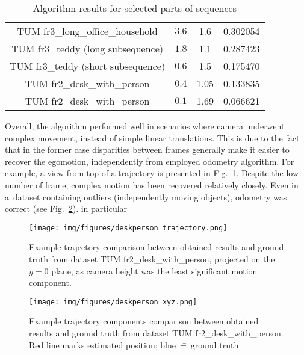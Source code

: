 \begin{table}[ht]
	\centering
	
	\begin{threeparttable}
		\caption{Algorithm results for selected parts of sequences}
		\label{tab:drift}
		
		\begin{tabularx}{0.9\textwidth}{C{0.32} C{0.2} C{0.15} C{0.33}}
			\toprule
			 &  &  & \\
			\midrule
			TUM fr3\_long\_office\_household & $3.6$ & 1.6 &  0.302054 \\
			TUM fr3\_teddy (long subsequence) & $1.8$ & 1.1 & 0.287423 \\
			TUM fr3\_teddy (short subsequence) & $0.6$ & 1.5 & 0.175470 \\
			TUM fr2\_desk\_with\_person & $0.4$ & 1.05 & 0.133835 \\
			TUM fr2\_desk\_with\_person & $0.1$ & 1.69 & 0.066621 \\
			\bottomrule
		\end{tabularx}
		
	\end{threeparttable}
\end{table}

Overall, the algorithm performed well in scenarios where camera underwent complex movement, instead of simple linear translations. This is due to the fact that in the former case disparities between frames generally make it easier to recover the egomotion, independently from employed odometry algorithm. For example, a view from top of a trajectory is presented in Fig.~\ref{fig:traject}. Despite the low number of frame, complex motion has been recovered relatively closely. Even in a~dataset containing outliers (independently moving objects), odometry was correct (see Fig.~\ref{fig:trajectxyz}).
in particular
\begin{figure}[ht]
	\centering\texttt{[image: img/figures/deskperson\_trajectory.png]}
	\caption{ Example trajectory comparison between obtained results and ground truth from dataset TUM fr2\_desk\_with\_person, projected on the $y=0$ plane, as camera height was the least significant motion component. }
	\label{fig:traject}
\end{figure}

\begin{figure}[ht]
	\centering\texttt{[image: img/figures/deskperson\_xyz.png]}
	\caption{ Example trajectory components comparison between obtained results and ground truth from dataset TUM fr2\_desk\_with\_person. Red line marks estimated position; blue~\==~ground truth }
	\label{fig:trajectxyz}
\end{figure}

